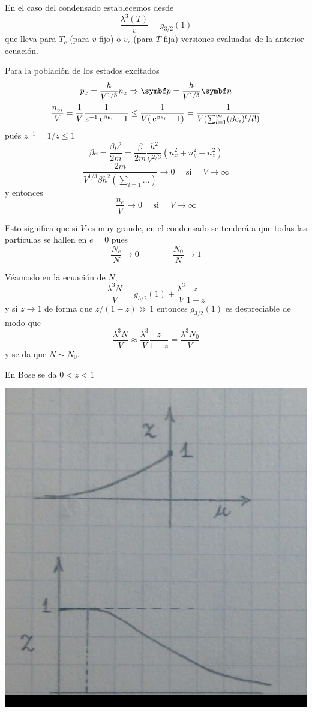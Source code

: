 \documentclass[10pt,oneside]{CBFT_book}
\begin{document}
En el caso del condensado establecemos desde 
\[
	\frac{\lambda^3(T)}{v} = g_{3/2}(1) 
\]
que lleva para $T_c$ (para $v$ fijo) o $v_c$ (para $T$ fija) versiones evaluadas de la anterior ecuación.

Para la población de los estados excitados
\[
	p_x = \frac{h}{V^{1/3}}n_x \Rightarrow  \vb{p} = \frac{h}{V^{1/3}} \vb{n}
\]
\[
	\frac{n_{e_i}}{V} = \frac{1}{V} \frac{1}{ z^{-1}\:\mathrm{e}^{\beta e_i} - 1 } \leq 
	\frac{1}{V(\:\mathrm{e}^{\beta e_i} - 1)} = \frac{1}{V(\sum_{l=1}^\infty (\beta e_i )^l/l!)}
\]
pués $z^{-1} = 1/z \leq 1$
\[
	\beta e = \frac{\beta p^2}{2m} = \frac{\beta}{2m} \frac{h^2}{V^{2/3}} ( n_x^2 + n_y^2 + n_z^2)
\]
\[
	\frac{2m}{V^{1/3} \beta h^2 (\sum_{l=1} ... )} \to 0 \quad \text{ si } \quad V \to \infty
\]
y entonces
\[
	\frac{n_e}{V} \to 0 \quad \text{ si } \quad V \to \infty
\]

Esto significa que si $V$ es muy grande, en el condensado se tenderá a que todas las partículas se hallen en
$ e = 0 $ pues 
\[
	\frac{N_e}{N} \to 0 \qquad \qquad \frac{N_0}{N} \to 1
\]

Véamoslo en la ecuación de $N$,
\[
	\frac{\lambda^3 N}{V} = g_{3/2}(1) + \frac{\lambda^3}{V} \frac{z}{1-z}
\]
y si $z \to 1$ de forma que $z/(1-z) \gg 1$ entonces $g_{3/2}(1)$ es despreciable de modo que
\[
	\frac{\lambda^3 N}{V} \approx \frac{\lambda^3}{V} \frac{z}{1-z} = \frac{\lambda^3 N_0}{V} 
\]
y se da que $ N \sim N_0 $.

En Bose se da $ 0 < z < 1$

\includegraphics[scale=0.5]{images/1625624397.jpg}
\end{document}
